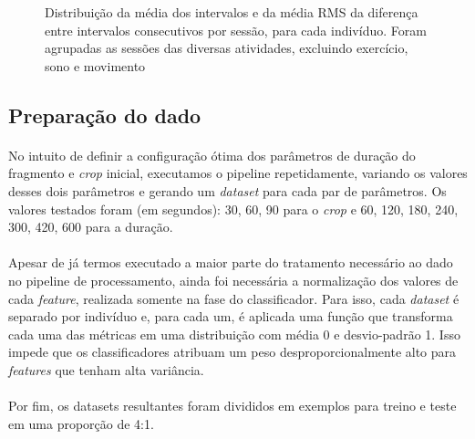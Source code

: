             \begin{figure}[h!]
                \centering
                \caption{Distribuição da média dos intervalos e da média RMS da diferença entre intervalos consecutivos por sessão, para cada indivíduo. Foram agrupadas as sessões das diversas atividades, excluindo exercício, sono e movimento}
                \label{sess_box_all}
            \end{figure}

        \subsection{Preparação do dado}
        
            \paragraph{} No intuito de definir a configuração ótima dos parâmetros de duração do fragmento e \textit{crop} inicial, executamos o pipeline repetidamente, variando os valores desses dois parâmetros e gerando um \textit{dataset} para cada par de parâmetros. Os valores testados foram (em segundos): 30, 60, 90 para o \textit{crop} e 60, 120, 180, 240, 300, 420, 600 para a duração.
        
            \paragraph{} Apesar de já termos executado a maior parte do tratamento necessário ao dado no pipeline de processamento, ainda foi necessária a normalização dos valores de cada \textit{feature}, realizada somente na fase do classificador. Para isso, cada \textit{dataset} é separado por indivíduo e, para cada um, é aplicada uma função que transforma cada uma das métricas em uma distribuição com média 0 e desvio-padrão 1. Isso impede que os classificadores atribuam um peso desproporcionalmente alto para \textit{features} que tenham alta variância.
            
            \paragraph{} Por fim, os datasets resultantes foram divididos em exemplos para treino e teste em uma proporção de 4:1. 
            
